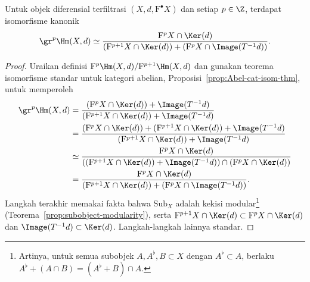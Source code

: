 \begin{lemma}\label{prop:induced-filtration-gr}
	Untuk objek diferensial terfiltrasi $(X,d,\mathrm{F}^\bullet X)$ dan setiap
	$p\in\Z$, terdapat isomorfisme kanonik
	\[ \gr^p\Hm(X,d)\simeq
	\dfrac{\mathrm{F}^pX\cap\Ker(d)}
	{(\mathrm{F}^{p+1}X\cap\Ker(d))
	 +(\mathrm{F}^pX\cap\Image(T^{-1}d))}. \]
\end{lemma}
\begin{proof}
	Uraikan definisi
	$\mathrm{F}^p\Hm(X,d)/\mathrm{F}^{p+1}\Hm(X,d)$ dan gunakan teorema
	isomorfisme standar untuk kategori abelian,
	Proposisi~\ref{prop:Abel-cat-isom-thm}, untuk memperoleh
	\begin{align*}
		\gr^p\Hm(X,d)
		&=\dfrac{(\mathrm{F}^pX\cap\Ker(d))+\Image(T^{-1}d)}
		{(\mathrm{F}^{p+1}X\cap\Ker(d))+\Image(T^{-1}d)} \\
		&=\dfrac{(\mathrm{F}^pX\cap\Ker(d))
		 +(\mathrm{F}^{p+1}X\cap\Ker(d))+\Image(T^{-1}d)}
		{(\mathrm{F}^{p+1}X\cap\Ker(d))+\Image(T^{-1}d)} \\
		&\simeq\dfrac{\mathrm{F}^pX\cap\Ker(d)}
		{((\mathrm{F}^{p+1}X\cap\Ker(d))+\Image(T^{-1}d))
		 \cap(\mathrm{F}^pX\cap\Ker(d))} \\
		&=\dfrac{\mathrm{F}^pX\cap\Ker(d)}
		{(\mathrm{F}^{p+1}X\cap\Ker(d))
		 +(\mathrm{F}^pX\cap\Image(T^{-1}d))}.
	\end{align*}
	Langkah terakhir memakai fakta bahwa $\mathrm{Sub}_X$ adalah kekisi
	modular\footnote{Artinya, untuk semua subobjek $A,A^\flat,B\subset X$ dengan
	$A^\flat\subset A$, berlaku
	$A^\flat+(A\cap B)=(A^\flat+B)\cap A$.}
	(Teorema~\ref{prop:subobject-modularity}), serta
	$\mathrm{F}^{p+1}X\cap\Ker(d)\subset\mathrm{F}^pX\cap\Ker(d)$ dan
	$\Image(T^{-1}d)\subset\Ker(d)$. Langkah-langkah lainnya standar.
\end{proof}

